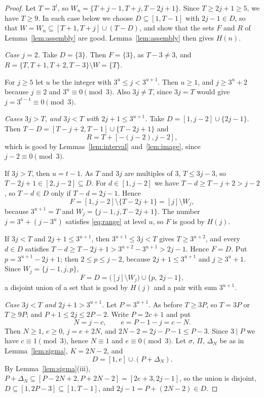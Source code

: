 \documentclass[preprint,12pt]{elsarticle}
\theoremstyle{definition}
\newcommand{\iv}[2]{[#1,#2]}
\begin{document}
\begin{proof}
Let $T=3^t$, so $W_n=\{T+j-1,T+j,T-2j+1\}$. Since $T\ge2j+1\ge5$, we have $T\ge9$. In each case below we choose $D\subseteq\iv1{T-1}$ with $2j-1\in D$, so that $W=W_n\subseteq\iv{T+1}{T+j}\cup(T-D)$, and show that the sets $F$ and $R$ of Lemma~\ref{lem:assembly} are good. Lemma~\ref{lem:assembly} then gives $H(n)$.

\emph{Case $j=2$.} Take $D=\{3\}$. Then $F=\{3\}$, as $T-3\ne3$, and $R=\{T,T+1,T+2,T-3\}\setminus W=\{T\}$.

For $j\ge5$ let $u$ be the integer with $3^u\le j<3^{u+1}$. Then $u\ge1$, and $j\ge3^u+2$ because $j\equiv2$ and $3^u\equiv0\pmod 3$. Also $3j\ne T$, since $3j=T$ would give $j=3^{t-1}\equiv0\pmod3$.

\emph{Cases $3j>T$, and $3j<T$ with $2j+1\le3^{u+1}$.} Take $D=\iv1{j-2}\cup\{2j-1\}$. Then $T-D=\iv{T-j+2}{T-1}\cup\{T-2j+1\}$ and
\[
R=T+\iv{-(j-2)}{j-2},
\]
which is good by Lemmas~\ref{lem:interval} and~\ref{lem:image}, since $j-2\equiv0\pmod3$.

If $3j>T$, then $u=t-1$. As $T$ and $3j$ are multiples of $3$, $T\le3j-3$, so $T-2j+1\in\iv2{j-2}\subseteq D$. For $d\in\iv1{j-2}$ we have $T-d\ge T-j+2>j-2$, so $T-d\in D$ only if $T-d=2j-1$. Hence
\[
F=\iv1{j-2}\setminus\{T-2j+1\}=[j]\setminus W_j,
\]
because $3^{u+1}=T$ and $W_j=\{j-1,j,T-2j+1\}$. The number $j=3^u+(j-3^u)$ satisfies \eqref{eq:range} at level $u$, so $F$ is good by $H(j)$.

If $3j<T$ and $2j+1\le3^{u+1}$, then $3^{u+1}\le3j<T$ gives $T\ge3^{u+2}$, and every $d\in D$ satisfies $T-d\ge T-2j+1>3^{u+2}-3^{u+1}>2j-1$. Hence $F=D$. Put $p=3^{u+1}-2j+1$; then $2\le p\le j-2$, because $2j+1\le 3^{u+1}$ and $j\ge3^u+1$. Since $W_j=\{j-1,j,p\}$,
\[
F=D=\bigl([j]\setminus W_j\bigr)\cup\{p,\,2j-1\},
\]
a disjoint union of a set that is good by $H(j)$ and a pair with sum $3^{u+1}$.

\emph{Case $3j<T$ and $2j+1>3^{u+1}$.} Let $P=3^{u+1}$. As before $T\ge3P$, so $T=3P$ or $T\ge9P$; and $P+1\le2j\le2P-2$. Write $P=2c+1$ and put
\[
N=j-c,\qquad e=P-1-j=c-N.
\]
Then $N\ge1$, $e\ge0$, $j=e+2N$, and $2N-2=2j-P-1\le P-3$. Since $3\mid P$ we have $c\equiv1\pmod3$, hence $N\equiv1$ and $e\equiv0\pmod 3$. Let $\sigma$, $\Pi$, $\Delta_N$ be as in Lemma~\ref{lem:sigma}, $K=2N-2$, and
\[
D=\iv1e\cup(P+\Delta_N).
\]
By Lemma~\ref{lem:sigma}(iii), $P+\Delta_N\subseteq\iv{P-2N+2}{P+2N-2}=\iv{2e+3}{2j-1}$, so the union is disjoint, $D\subseteq\iv1{2P-3}\subseteq\iv1{T-1}$, and $2j-1=P+(2N-2)\in D$.


\end{proof}
\end{document}
